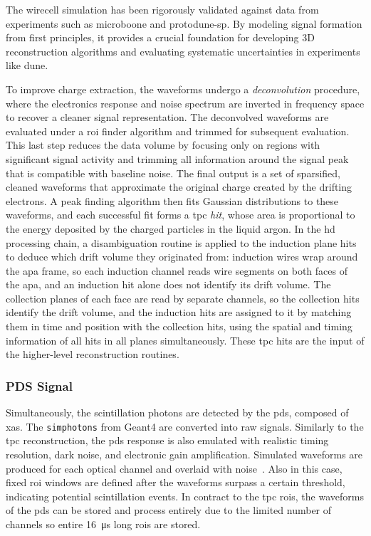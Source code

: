 The \gls{wirecell} simulation has been rigorously validated against data from experiments such as \gls{microboone} and \gls{protodune-sp}. By modeling signal formation from first principles, it provides a crucial foundation for developing 3D reconstruction algorithms and evaluating systematic uncertainties in experiments like \gls{dune}.

To improve charge extraction, the waveforms undergo a \emph{deconvolution} procedure, where the electronics response and noise spectrum are inverted in frequency space to recover a cleaner signal representation. The deconvolved waveforms are evaluated under a \gls{roi} finder algorithm and trimmed for subsequent evaluation. This last step reduces the data volume by focusing only on regions with significant signal activity and trimming all information around the signal peak that is compatible with baseline noise. The final output is a set of sparsified, cleaned waveforms that approximate the original charge created by the drifting electrons. A peak finding algorithm then fits Gaussian distributions to these waveforms, and each successful fit forms a \gls{tpc} \emph{hit}, whose area is proportional to the energy deposited by the charged particles in the liquid argon. In the \gls{hd} processing chain, a disambiguation routine is applied to the induction plane hits to deduce which drift volume they originated from: induction wires wrap around the \gls{apa} frame, so each induction channel reads wire segments on both faces of the \gls{apa}, and an induction hit alone does not identify its drift volume. The collection planes of each face are read by separate channels, so the collection hits identify the drift volume, and the induction hits are assigned to it by matching them in time and position with the collection hits, using the spatial and timing information of all hits in all planes simultaneously. These \gls{tpc} hits are the input of the higher-level reconstruction routines.

\subsubsection{PDS Signal}
Simultaneously, the scintillation photons are detected by the \gls{pds}, composed of \gls{xa}s. The \texttt{simphotons} from Geant4 are converted into raw signals. Similarly to the \gls{tpc} reconstruction, the \gls{pds} response is also emulated with realistic timing resolution, dark noise, and electronic gain amplification. Simulated waveforms are produced for each optical channel and overlaid with noise~\cite{Acerbi:2025lwy,Andreotti:2024blh}. Also in this case, fixed \gls{roi} windows are defined after the waveforms surpass a certain threshold, indicating potential scintillation events. In contract to the \gls{tpc} \gls{roi}s, the waveforms of the \gls{pds} can be stored and process entirely due to the limited number of channels so entire \SI{16}{\micro\second} long \gls{roi}s are stored.

